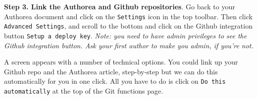 \textbf{Step 3. Link the Authorea and Github repositories}. Go back to your Authorea document and click on the \verb|Settings| icon in the top toolbar. Then click \verb|Advanced Settings|, and scroll to the bottom and click on the Github integration button \verb|Setup a deploy key|. \textit{Note: you need to have admin privileges to see the Github integration button. Ask your first author to make you admin, if you're not.} 

A screen appears with a number of technical options. You could link up your Github repo and the Authorea article, step-by-step but we can do this automatically for you in one click. All you have to do is click on \verb|Do this automatically| at the top of the Git functions page. 